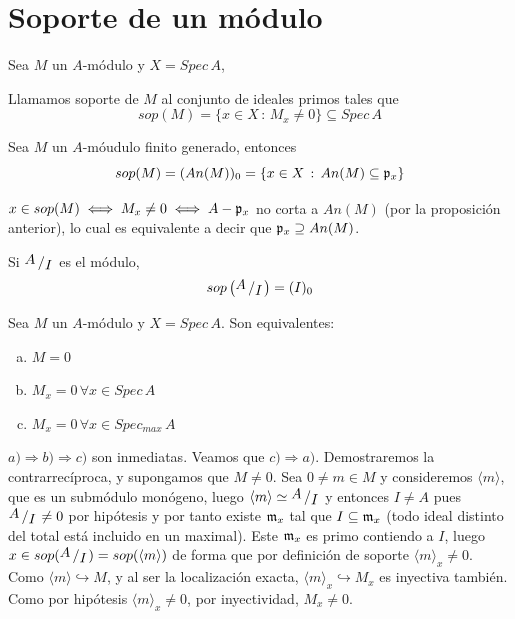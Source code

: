 \section{Soporte de un m\'odulo}
Sea $M$ un $A$-m\'odulo y $X=Spec\, A$,
\begin{defi}
    Llamamos soporte de $M$ al conjunto de ideales primos tales que 
    $$sop(M)=\{x\in X\, : \, M_x\neq 0\} \subseteq Spec\, A$$
\end{defi}
\begin{prop}
    Sea $M$ un $A$-m\'oudulo finito generado, entonces
    $$sop(M)=(An(M))_0= \{x\in X \, : \, An(M) \subseteq \mathfrak{p}_x\}$$
\end{prop}
\begin{dem}
    $x\in sop(M) \iff M_x\neq 0 \iff A-\mathfrak{p}_x $ no corta a $An(M)$ (por la proposici\'on anterior), lo cual es equivalente a decir que $\mathfrak{p}_x \supseteq An(M)$. 
\end{dem}
\begin{ejem}
    Si $\modulo{A}{I}$ es el m\'odulo,
    $$sop\left(\modulo{A}{I}\right) = (I)_0$$
\end{ejem}
\begin{prop}
    Sea $M$ un $A$-m\'odulo y $X = Spec\, A$. Son equivalentes: \vspace{-3mm}
    \begin{enumerate}[a)]
        \item $M=0$
        \item $M_x= 0 \, \forall x\in Spec \, A$
        \item $M_x= 0 \, \forall x\in Spec_{max} \, A$
    \end{enumerate}
\end{prop}
\begin{dem}
    $a) \Rightarrow b) \Rightarrow c)$ son inmediatas. Veamos que $c) \Rightarrow a)$. Demostraremos la contrarrec\'iproca, y supongamos que $M\neq 0$. Sea $0\neq m \in M$ y consideremos $\langle m \rangle$, que es un subm\'odulo mon\'ogeno, luego $\langle m \rangle \simeq \modulo{A}{I}$ y entonces $I \neq A$ pues $\modulo{A}{I} \neq 0$ por hip\'otesis y por tanto existe $\mathfrak{m}_x$ tal que $I\subseteq \mathfrak{m}_x$ (todo ideal distinto del total est\'a incluido en un maximal). Este $\mathfrak{m}_x$ es primo contiendo a $I$, luego $x \in sop(\modulo{A}{I}) = sop (\langle m \rangle) $ de forma que por definici\'on de soporte $\langle m \rangle_x \neq 0$. Como $\langle m \rangle \hookrightarrow M$, y al ser la localizaci\'on exacta, $\langle m \rangle_x \hookrightarrow M_x$ es inyectiva tambi\'en. Como por hip\'otesis $\langle m \rangle_x \neq 0$, por inyectividad, $M_x \neq 0$. 
\end{dem}
